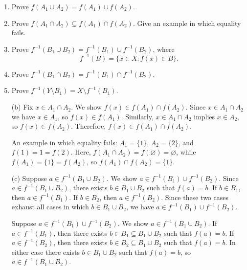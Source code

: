 \documentclass[12pt,reqno]{amsart}
\renewcommand{\emptyset}{\ensuremath{\varnothing}}
\renewcommand{\subset}{\ensuremath{\subsetneq}}
\begin{document}
\begin{enumerate}[{\bf 1.}]
\begin{enumerate}
\item
Prove $f( A_1 \cup A_2 ) = f( A_1) \cup f( A_2 )$.
 
\item
Prove $f( A_1 \cap A_2 ) \subset f( A_1) \cap f( A_2 )$.  Give an example in which equality fails.
 
\item
Prove $f^{-1}( B_1 \cup B_2 ) = f^{-1}( B_1) \cup f^{-1}(B_2 )$, where
\[
f^{-1}(B) = \{ x \in X : f(x) \in B \}.
\]
 
\item
Prove $f^{-1}( B_1 \cap B_2 ) = f^{-1}( B_1) \cap f^{-1}( B_2 )$. 
 
\item
Prove $f^{-1}( Y \setminus B_1 ) = X \setminus f^{-1}( B_1)$.
 
\end{enumerate}
\bigskip
{}
\medskip
\begin{enumerate}
\item[(b)] 
Fix $x \in A_1 \cap A_2$.  We show $f(x) \in f(A_1) \cap f(A_2)$.
Since $x \in A_1 \cap A_2$ we have $x \in A_1$, so $f(x) \in f(A_1)$.
Similarly, $x \in A_1 \cap A_2$ implies $x \in A_2$, so $f(x) \in f(A_2)$.
Therefore, $f(x) \in f(A_1) \cap f(A_2)$.

An example in which equality fails: $A_1 = \{1\}$,
$A_2 = \{2\}$, and $f(1) = 1 = f(2)$.  
Here, $f(A_1\cap A_2) = f(\emptyset) = \emptyset$, while 
$f(A_1) = \{1 \} = f(A_2)$, so 
$f(A_1)\cap f(A_2) = \{1 \}$.

\medskip

\item[(c)] Suppose $a \in f^{-1}(B_1 \cup B_2)$.  
We show $a \in f^{-1}(B_1) \cup f^{-1}(B_2)$.
Since $a \in f^{-1}(B_1 \cup B_2)$, there exists 
$b \in B_1\cup B_2$ such that $f(a) = b$.
If $b \in B_1$, then $a\in f^{-1}(B_1)$.
If $b \in B_2$, then $a\in f^{-1}(B_2)$. 
Since these two cases exhaust all cases
in which $b \in B_1\cup B_2$, 
we have $a \in f^{-1}(B_1) \cup f^{-1}(B_2)$.

Suppose $a \in f^{-1}(B_1) \cup f^{-1}(B_2)$.
We show $a \in f^{-1}(B_1 \cup B_2)$.  
If $a \in f^{-1}(B_1)$, then 
there exists $b \in B_1 \subseteq B_1 \cup B_2$ such that $f(a) = b$.
If $a \in f^{-1}(B_2)$, then 
there exists $b \in B_2 \subseteq B_1 \cup B_2$ such that $f(a) = b$.
In either case 
there exists $b \in B_1 \cup B_2$ such that $f(a) = b$, so 
$a \in f^{-1}(B_1 \cup B_2)$.


\end{enumerate}
 

\end{enumerate}
\end{document}
